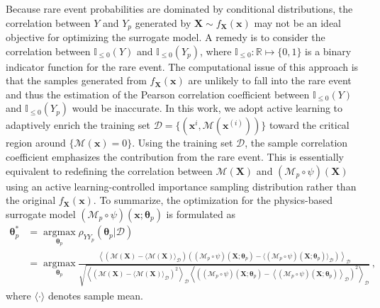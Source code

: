 \documentclass[number,preprint,3p]{elsarticle}
\def\r{\mathbb{R}}
\newcommand{\1}[2]{\mathbb{I}_{#1}\left(#2\right)}
\newcommand{\vect}[1]{\boldsymbol{#1}}
\begin{document}
 Because rare event probabilities are dominated by conditional distributions, the correlation between $Y$ and $Y_p$ generated by $\vect X\sim f_{\vect X}(\vect x)$ may not be an ideal objective for optimizing the surrogate model. A remedy is to consider the correlation between $\1{\leq0}{Y}$ and $\1{\leq0}{Y_p}$, where $\mathbb{I}_{\leq0}:\r\mapsto\{0,1\}$ is a binary indicator function for the rare event. The computational issue of this approach is that the samples generated from $f_{\vect X}(\vect x)$ are unlikely to fall into the rare event and thus the estimation of the Pearson correlation coefficient between $\1{\leq0}{Y}$ and $\1{\leq0}{Y_p}$ would be inaccurate. In this work, we adopt active learning to adaptively enrich the training set $\mathcal{D}=\{(\vect x^{i},\mathcal{M}(\vect x^{(i)}))\}$ toward the critical region around $\{\mathcal{M}(\vect x)=0\}$. Using the training set $\mathcal{D}$, the sample correlation coefficient emphasizes the contribution from the rare event. This is essentially equivalent to redefining the correlation between $\mathcal{M}(\vect X)$ and $(\mathcal{M}_p\circ\psi)(\vect X)$ using an active learning-controlled importance sampling distribution rather than the original $f_{\vect X}(\vect x)$. To summarize, the optimization for the physics-based surrogate model $(\mathcal{M}_{p}\circ\psi)(\vect x;\vect\theta_p)$ is formulated as
	\begin{equation}\label{OptimizationModel}
 \begin{aligned}
     \vect{\theta} ^{\ast }_{p}&=\mathop{\arg\max}\limits_{\vect{\theta}_{p}}\rho_{YY_p}(\vect{\theta}_{p}|\mathcal{D})\\
     &=\mathop{\arg\max}\limits_{\vect{\theta}_{p}}\frac{\left \langle (\mathcal{M}(\vect{X})- \langle \mathcal{M}(\vect{X})\rangle _{\mathcal{D}})\left((\mathcal{M}_{p}\circ\psi)(\vect{X};\vect{\theta}_{p})- \langle (\mathcal{M}_{p}\circ\psi)(\vect{X};\vect{\theta}_{p})\rangle _{\mathcal{D}}\right)\right \rangle _{\mathcal{D}}}{\sqrt{\left \langle (\mathcal{M}(\vect{X})- \langle \mathcal{M}(\vect{X})\rangle _{\mathcal{D}})^2\right \rangle _{\mathcal{D}} \left \langle ((\mathcal{M}_{p}\circ\psi)(\vect{X};\vect{\theta}_{p})- \left \langle (\mathcal{M}_{p}\circ\psi)(\vect{X};\vect{\theta}_{p}) \right \rangle _{\mathcal{D}})^2\right \rangle _{\mathcal{D}}}}\,,
 \end{aligned}
	\end{equation}
 where $\langle\cdot\rangle$ denotes sample mean. 
\end{document}
